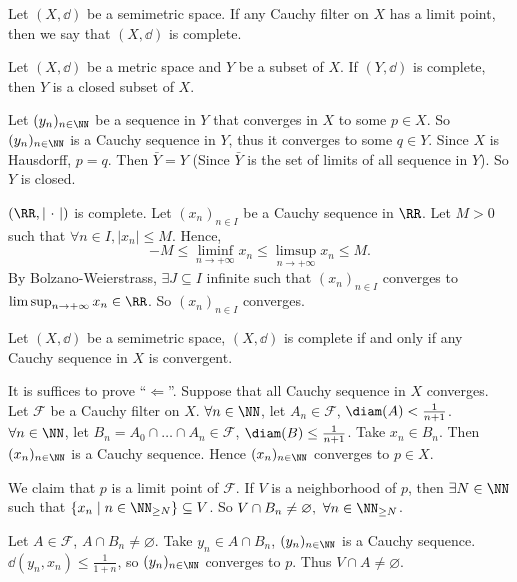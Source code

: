 \begin{definitionenv}
    Let $(X,\dd)$ be a semimetric space. If any Cauchy filter on $X$ has a limit point, then we say that $(X,\dd)$ is complete.
\end{definitionenv}
\begin{propositionenv}
    Let $(X,\dd)$ be a {\color{brown} metric space} and $Y$ be a subset of $X$. If $(Y,\dd)$ is complete, then $Y$ is a closed subset of $X$.
\end{propositionenv}
\begin{proofenv}
    Let $(y_n)_{n\in\NN}$ be a sequence in $Y$ that converges in $X$ to some $p\in X$. So $(y_n)_{n\in \NN}$ is a Cauchy sequence in $Y$, thus it converges to some $q\in Y$. Since $X$ is Hausdorff, $p=q$. Then $\bar{Y}=Y$ (Since $\bar{Y}$ is the set of limits of all sequence in $Y$). So $Y$ is closed.
\end{proofenv}
\begin{exampleenv}
    $(\RR,\left|\ \cdot\ \right|)$ is complete.
    \newline
    Let $(x_n)_{n\in I}$ be a Cauchy sequence in $\RR$. Let $M>0$ such that $\forall n\in I, |x_n|\le M$. Hence,
    $$ -M\le \liminf_{n\rightarrow +\infty} x_n\le \limsup_{n\rightarrow +\infty}x_n\le M.$$
    By Bolzano-Weierstrass, $\exists J\subseteq I$ infinite such that $(x_n)_{n\in I}$ converges to $\limsup_{n\rightarrow +\infty}x_n\in \RR$. So $(x_n)_{n\in I}$ converges.
\end{exampleenv}
\begin{propositionenv}
    Let $(X,\dd)$ be a semimetric space, $(X,\dd)$ is complete if and only if any Cauchy sequence in $X$ is convergent.
\end{propositionenv}
\begin{proofenv}
    It is suffices to prove ``$\Leftarrow$''. Suppose that all Cauchy sequence in $X$ converges. Let $\mathcal{F}$ be a Cauchy filter on $X$. 
    $\forall n\in \NN$, let $A_n\in \mathcal{F}$, $\diam(A)<\frac{1}{n+1}$. $\forall n\in \NN$, let $B_n=A_0\cap\ldots\cap A_n\in \mathcal{F}$, $\diam(B)\le \frac{1}{n+1}$. Take $x_n\in B_n$. Then $(x_n)_{n\in \NN}$ is a Cauchy sequence. Hence $(x_n)_{n\in \NN}$ converges to $p\in X$. 
    
    \quad We claim that $p$ is a limit point of $\mathcal{F}$. If $V$ is a neighborhood of $p$, then $\exists N\in \NN$ such that $\{x_n\mid  n\in \NN_{\ge N}\}\subseteq V$. So $V\cap B_n\neq\varnothing, \ \forall n \in \NN_{\ge N}$.
    
    \quad Let $A\in \mathcal{F}$, $A\cap B_n\neq\varnothing$. Take $y_n\in A\cap B_n$, $(y_n)_{n\in\NN}$ is a Cauchy sequence. $\dd(y_n,x_n)\le\frac{1}{1+n}$, so $(y_n)_{n\in \NN}$ converges to $p$. Thus $V\cap A\neq \varnothing$.
\end{proofenv}
